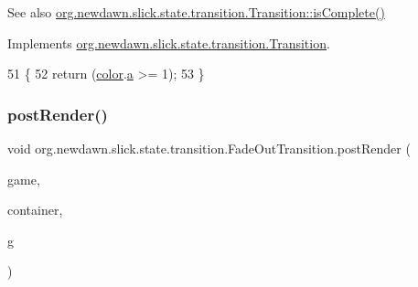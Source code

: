 \begin{DoxySeeAlso}{See also}
\mbox{\hyperlink{interfaceorg_1_1newdawn_1_1slick_1_1state_1_1transition_1_1_transition_af397d5185cf09c30c3f51d5021d63815}{org.\+newdawn.\+slick.\+state.\+transition.\+Transition\+::is\+Complete()}} 
\end{DoxySeeAlso}


Implements \mbox{\hyperlink{interfaceorg_1_1newdawn_1_1slick_1_1state_1_1transition_1_1_transition_af397d5185cf09c30c3f51d5021d63815}{org.\+newdawn.\+slick.\+state.\+transition.\+Transition}}.


\begin{DoxyCode}
51                                 \{
52         \textcolor{keywordflow}{return} (\mbox{\hyperlink{classorg_1_1newdawn_1_1slick_1_1state_1_1transition_1_1_fade_out_transition_a71c42f67f13c8572900a197aef96aa90}{color}}.\mbox{\hyperlink{classorg_1_1newdawn_1_1slick_1_1_color_ab9288c822ff7614a77c887eb8c2595a7}{a}} >= 1);
53     \}
\end{DoxyCode}
\mbox{\label{classorg_1_1newdawn_1_1slick_1_1state_1_1transition_1_1_fade_out_transition_a7e5dacd1888317dd8ccaee8d216890dc}} 
\subsubsection{\texorpdfstring{post\+Render()}{postRender()}}
{\footnotesize\ttfamily void org.\+newdawn.\+slick.\+state.\+transition.\+Fade\+Out\+Transition.\+post\+Render (\begin{DoxyParamCaption}\item[{\mbox{\hyperlink{classorg_1_1newdawn_1_1slick_1_1state_1_1_state_based_game}{State\+Based\+Game}}}]{game,  }\item[{\mbox{\hyperlink{classorg_1_1newdawn_1_1slick_1_1_game_container}{Game\+Container}}}]{container,  }\item[{\mbox{\hyperlink{classorg_1_1newdawn_1_1slick_1_1_graphics}{Graphics}}}]{g }\end{DoxyParamCaption})\hspace{0.3cm}{\ttfamily [inline]}}

